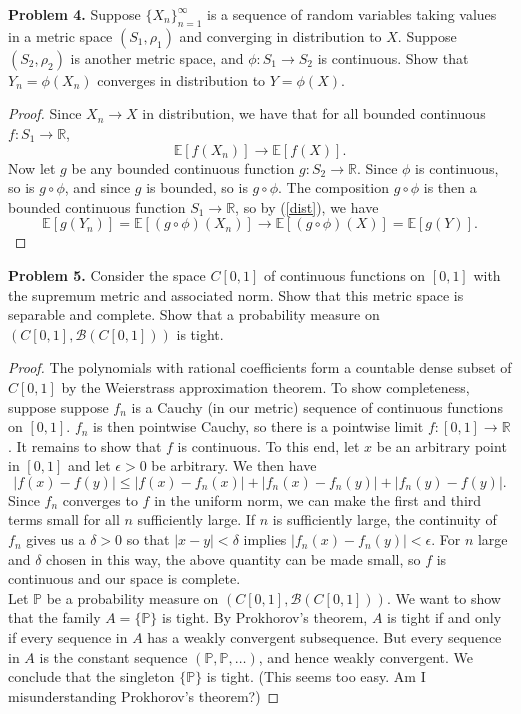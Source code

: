 \documentclass[11pt,letterpaper]{report}
\newcommand{\reals}{\mathbb{R}}
\newcommand{\mcal}[1]{\mathcal{#1}}
\newcommand{\E}{\mathbb{E}}
\newcommand{\Prob}{\mathbb{P}}
\begin{document}
\noindent\textbf{Problem 4. }
Suppose $\{X_n\}_{n=1}^\infty$ is a sequence of random variables taking values in a metric space $(S_1, \rho_1)$ and converging in distribution to $X$. Suppose $(S_2, \rho_2)$ is another metric space, and $\phi: S_1\to S_2$ is continuous. Show that $Y_n = \phi(X_n)$ converges in distribution to $Y = \phi(X)$.
\begin{proof}
	Since $X_n \to X$ in distribution, we have that for all bounded continuous $f: S_1\to \reals$,
	\begin{equation}\label{dist}
	\E[f(X_n)] \to \E[f(X)].
	\end{equation}
	Now let $g$ be any bounded continuous function $g: S_2\to \reals$. Since $\phi$ is continuous, so is $g\circ \phi$, and since $g$ is bounded, so is $g\circ \phi$. The composition $g\circ \phi$ is then a bounded continuous function $S_1\to \reals$, so by (\ref{dist}), we have
	\[
	\E[g(Y_n)] = \E[(g\circ \phi)(X_n)] \to \E[(g\circ \phi)(X)] = \E[g(Y)].
	\]	
\end{proof}

\noindent\textbf{Problem 5. }
Consider the space $C[0,1]$ of continuous functions on $[0,1]$ with the supremum metric and associated norm. Show that this metric space is separable and complete. Show that a probability measure on $(C[0,1], \mcal{B}(C[0,1]))$ is tight.
\begin{proof}
	The polynomials with rational coefficients form a countable dense subset of $C[0,1]$ by the Weierstrass approximation theorem. To show completeness, suppose suppose $f_n$ is a Cauchy (in our metric) sequence of continuous functions on $[0,1]$. $f_n$ is then pointwise Cauchy, so there is a pointwise limit $f:[0,1]\to \reals$. It remains to show that $f$ is continuous. To this end, let $x$ be an arbitrary point in $[0,1]$ and let $\epsilon>0$ be arbitrary. We then have
	\[
	|f(x)-f(y)| \leq |f(x)-f_n(x)| + |f_n(x) - f_n(y)| + |f_n(y) - f(y)|.
	\]
	Since $f_n$ converges to $f$ in the uniform norm, we can make the first and third terms small for all $n$ sufficiently large. If $n$ is sufficiently large, the continuity of $f_n$ gives us a $\delta>0$ so that $|x-y|< \delta$ implies $|f_n(x)-f_n(y)|<\epsilon$. For $n$ large and $\delta$ chosen in this way, the above quantity can be made small, so $f$ is continuous and our space is complete.\\

	\noindent Let $\Prob$ be a probability measure on $(C[0,1], \mcal{B}(C[0,1]))$. We want to show that the family $A = \{\Prob\}$ is tight. By Prokhorov's theorem, $A$ is tight if and only if every sequence in $A$ has a weakly convergent subsequence. But every sequence in $A$ is the constant sequence $(\Prob, \Prob, \ldots)$, and hence weakly convergent. We conclude that the singleton $\{\Prob\}$ is tight. (This seems too easy. Am I misunderstanding Prokhorov's theorem?)
\end{proof}
\end{document}
